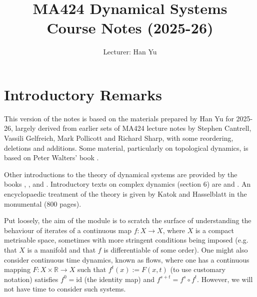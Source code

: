 \documentclass[12pt]{article}
\date{}
\def\myfont{\fontfamily{cmss}\selectfont}
\theoremstyle{definition}
\theoremstyle{remark}
\begin{document}
 
\title{MA424 Dynamical Systems \\ Course Notes (2025-26)}%

\author{Lecturer: Han Yu} 








\maketitle

\tableofcontents

\newpage


\setcounter{section}{-1}
\section{Introductory Remarks}
This version of the notes is based on the materials prepared by Han Yu for 2025-26, largely derived
 from earlier sets of MA424 lecture notes by Stephen Cantrell, Vassili Gelfreich, Mark Pollicott and Richard Sharp,
with some reordering, deletions and additions. Some material, particularly on topological
dynamics, is based on 
Peter Walters' book \cite{Walters}.

Other introductions to the theory of dynamical systems are provided by the books
\cite{BS02}, \cite{Dev03}, \cite{HK03} and \cite{Ste10}. 
Introductory texts on complex dynamics (section 6)
are  \cite{Bea91} and \cite{Stein93}.
An encyclopaedic treatment of the theory is given by Katok and Hasselblatt in the monumental \cite{KH95} (800 pages).

Put loosely, the aim of the module is to scratch the surface of understanding the behaviour 
of iterates of a continuous map $f : X \to X$, where $X$ is a compact metrisable space,
sometimes with more stringent conditions being imposed (e.g. that $X$ is a manifold
and that $f$ is differentiable of some order). One might also consider continuous time dynamics,
known as flows, where one has a continuous mapping $F : X \times \mathbb R \to X$
such that $f^t(x) := F(x,t)$ (to use customary notation)
satisfies
$f^0 = \mathrm{id}$ (the identity map) and $f^{s+t} = f^s \circ f^t$. However, we will not have time to consider such systems.
\end{document}
